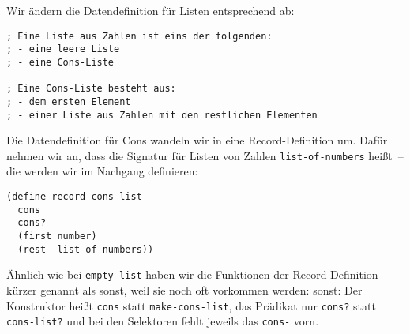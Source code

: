 Wir ändern die Datendefinition für Listen entsprechend ab:
%
\begin{lstlisting}
; Eine Liste aus Zahlen ist eins der folgenden:
; - eine leere Liste
; - eine Cons-Liste

; Eine Cons-Liste besteht aus:
; - dem ersten Element
; - einer Liste aus Zahlen mit den restlichen Elementen
\end{lstlisting}
%
Die Datendefinition für Cons wandeln wir in eine Record-Definition um.
Dafür nehmen wir an, dass die Signatur für Listen von Zahlen
\lstinline{list-of-numbers} heißt~-- die werden wir im Nachgang
definieren:
%
\begin{lstlisting}
(define-record cons-list
  cons
  cons?
  (first number)
  (rest  list-of-numbers))
\end{lstlisting}
%
Ähnlich wie bei \lstinline{empty-list} haben wir die Funktionen der
Record-Definition kürzer genannt als sonst, weil sie noch oft
vorkommen werden:
sonst:\label{def:cons}
Der Konstruktor heißt \lstinline{cons} statt
\lstinline{make-cons-list}, das Prädikat nur \lstinline{cons?}  statt
\lstinline{cons-list?} und bei den Selektoren fehlt jeweils das
\lstinline{cons-} vorn.

